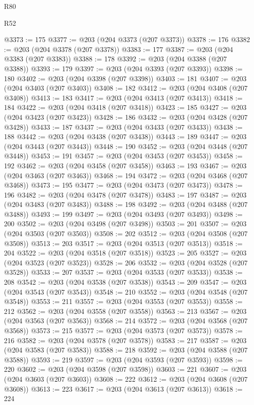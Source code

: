 \begin{lexlean}{R80}
\begin{lexlean}{R52}
\begin{coremodule}
{{{{{{{{{{{{{{{{{{{{{{{{{{{{{{{{{{{{{{{{{{{{{{{{{{{{{{{{{{{{{{{{{{{{{{{{{{{{{{{{{{{{{{{{{{{{{{{{{{{{{{{{{{{{{{{{{{{{{{{{{{{{{{{{{{{{{{{{{{{{{{{{{{{{{{{{{{{{{{{{{{{{{{{{{{{{{{{{{{{{{{{{{{{{{{{{{{{{{{@3373 := 175
@3377 := @203 (@204 @3373 (@207 @3373))
@3378 := 176
@3382 := @203 (@204 @3378 (@207 @3378))
@3383 := 177
@3387 := @203 (@204 @3383 (@207 @3383))
@3388 := 178
@3392 := @203 (@204 @3388 (@207 @3388))
@3393 := 179
@3397 := @203 (@204 @3393 (@207 @3393))
@3398 := 180
@3402 := @203 (@204 @3398 (@207 @3398))
@3403 := 181
@3407 := @203 (@204 @3403 (@207 @3403))
@3408 := 182
@3412 := @203 (@204 @3408 (@207 @3408))
@3413 := 183
@3417 := @203 (@204 @3413 (@207 @3413))
@3418 := 184
@3422 := @203 (@204 @3418 (@207 @3418))
@3423 := 185
@3427 := @203 (@204 @3423 (@207 @3423))
@3428 := 186
@3432 := @203 (@204 @3428 (@207 @3428))
@3433 := 187
@3437 := @203 (@204 @3433 (@207 @3433))
@3438 := 188
@3442 := @203 (@204 @3438 (@207 @3438))
@3443 := 189
@3447 := @203 (@204 @3443 (@207 @3443))
@3448 := 190
@3452 := @203 (@204 @3448 (@207 @3448))
@3453 := 191
@3457 := @203 (@204 @3453 (@207 @3453))
@3458 := 192
@3462 := @203 (@204 @3458 (@207 @3458))
@3463 := 193
@3467 := @203 (@204 @3463 (@207 @3463))
@3468 := 194
@3472 := @203 (@204 @3468 (@207 @3468))
@3473 := 195
@3477 := @203 (@204 @3473 (@207 @3473))
@3478 := 196
@3482 := @203 (@204 @3478 (@207 @3478))
@3483 := 197
@3487 := @203 (@204 @3483 (@207 @3483))
@3488 := 198
@3492 := @203 (@204 @3488 (@207 @3488))
@3493 := 199
@3497 := @203 (@204 @3493 (@207 @3493))
@3498 := 200
@3502 := @203 (@204 @3498 (@207 @3498))
@3503 := 201
@3507 := @203 (@204 @3503 (@207 @3503))
@3508 := 202
@3512 := @203 (@204 @3508 (@207 @3508))
@3513 := 203
@3517 := @203 (@204 @3513 (@207 @3513))
@3518 := 204
@3522 := @203 (@204 @3518 (@207 @3518))
@3523 := 205
@3527 := @203 (@204 @3523 (@207 @3523))
@3528 := 206
@3532 := @203 (@204 @3528 (@207 @3528))
@3533 := 207
@3537 := @203 (@204 @3533 (@207 @3533))
@3538 := 208
@3542 := @203 (@204 @3538 (@207 @3538))
@3543 := 209
@3547 := @203 (@204 @3543 (@207 @3543))
@3548 := 210
@3552 := @203 (@204 @3548 (@207 @3548))
@3553 := 211
@3557 := @203 (@204 @3553 (@207 @3553))
@3558 := 212
@3562 := @203 (@204 @3558 (@207 @3558))
@3563 := 213
@3567 := @203 (@204 @3563 (@207 @3563))
@3568 := 214
@3572 := @203 (@204 @3568 (@207 @3568))
@3573 := 215
@3577 := @203 (@204 @3573 (@207 @3573))
@3578 := 216
@3582 := @203 (@204 @3578 (@207 @3578))
@3583 := 217
@3587 := @203 (@204 @3583 (@207 @3583))
@3588 := 218
@3592 := @203 (@204 @3588 (@207 @3588))
@3593 := 219
@3597 := @203 (@204 @3593 (@207 @3593))
@3598 := 220
@3602 := @203 (@204 @3598 (@207 @3598))
@3603 := 221
@3607 := @203 (@204 @3603 (@207 @3603))
@3608 := 222
@3612 := @203 (@204 @3608 (@207 @3608))
@3613 := 223
@3617 := @203 (@204 @3613 (@207 @3613))
@3618 := 224
}}}}}}}}}}}}}}}}}}}}}}}}}}}}}}}}}}}}}}}}}}}}}}}}}}}}}}}}}}}}}}}}}}}}}}}}}}}}}}}}}}}}}}}}}}}}}}}}}}}}}}}}}}}}}}}}}}}}}}}}}}}}}}}}}}}}}}}}}}}}}}}}}}}}}}}}}}}}}}}}}}}}}}}}}}}}}}}}}}}}}}}}}}}}}}}}}}}}}}
\end{coremodule}
\end{lexlean}
\end{lexlean}
